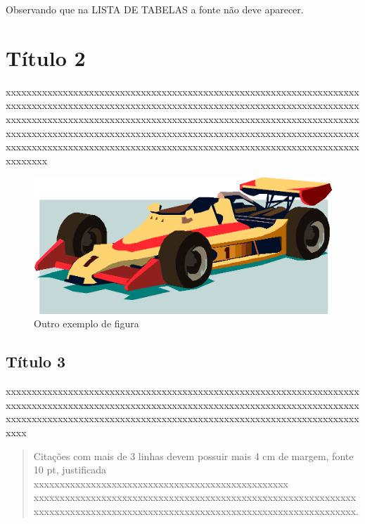 Observando que na LISTA DE TABELAS a fonte não deve aparecer.

\section{Título 2}

xxxxxxxxxx\-xxxxxxxxxx\-xxxxxxxxxx\-xxxxxxxxxx\-xxxxxxxxxx\-xxxxxxxxxx\-xxxxxxxxxx\-xxxxxxxxxx\-xxxxxxxxxx\-xxxxxxxxxx\-xxxxxxxxxx\-xxxxxxxxxx\-xxxxxxxxxx\-xxxxxxxxxx\-xxxxxxxxxx\-xxxxxxxxxx\-xxxxxxxxxx\-xxxxxxxxxx\-xxxxxxxxxx\-xxxxxxxxxx\-xxxxxxxxxx\-xxxxxxxxxx\-xxxxxxxxxx\-xxxxxxxxxx\-xxxxxxxxxx\-xxxxxxxxxx\-xxxxxxxxxx\-xxxxxxxxxx\-xxxxxxxxxx\-xxxxxxxxxx\-xxxxxxxxxx\-xxxxxxxxxx\-xxxxxxxxxx\-xxxxxxxxxx\-xxxxxxxx

\begin{figure}[h]
    \centerline{\includegraphics{imagens/img-carro.png}}
    \caption{Outro exemplo de figura}
    \label{fig:carro}
\end{figure}

\subsection{Título 3}

xxxxxxxxxx\-xxxxxxxxxx\-xxxxxxxxxx\-xxxxxxxxxx\-xxxxxxxxxx\-xxxxxxxxxx\-xxxxxxxxxx\-xxxxxxxxxx\-xxxxxxxxxx\-xxxxxxxxxx\-xxxxxxxxxx\-xxxxxxxxxx\-xxxxxxxxxx\-xxxxxxxxxx\-xxxxxxxxxx\-xxxxxxxxxx\-xxxxxxxxxx\-xxxxxxxxxx\-xxxxxxxxxx\-xxxxxxxxxx\-xxxxxxxx

\begin{quote}Citações com mais de 3 linhas devem possuir mais 4 cm de margem, fonte 10 pt, justificada xxxxxxxxxx\-xxxxxxxxxx\-xxxxxxxxxx\-xxxxxxxxxx\-xxxxxxxxx xxxxxxxxxx\-xxxxxxxxxx\-xxxxxxxxxx\-xxxxxxxxxx\-xxxxxxxxxx\-xxxxxxxxxx\-xxxxxxxxxx\-xxxxxxxxxx\-xxxxxxxxxx\-xxxxxxxxxx\-xxxxxxxxxx\-xxxxxxxxxx\-xxxx.\end{quote}

